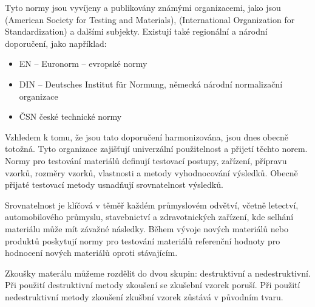 \documentclass[letterpaper,10pt,english]{jupyterBook}
\begin{document}
\noindent{}

\sphinxAtStartPar
Tyto normy jsou vyvíjeny a publikovány známými organizacemi, jako jsou  (American Society for Testing and Materials),  (International Organization for Standardization) a dalšími subjekty. Existují také regionální a národní doporučení, jako například:
\begin{itemize}
\item {} 
\sphinxAtStartPar
EN – Euronorm – evropské normy

\item {} 
\sphinxAtStartPar
DIN – Deutsches Institut für Normung, německá národní normalizační organizace

\item {} 
\sphinxAtStartPar
ČSN \sphinxhyphen{} české technické normy

\end{itemize}

\sphinxAtStartPar
Vzhledem k tomu, že jsou tato doporučení harmonizována, jsou dnes obecně totožná. Tyto organizace zajišťují univerzální použitelnost a přijetí těchto norem. Normy pro testování materiálů definují testovací postupy, zařízení, přípravu vzorků, rozměry vzorků, vlastnosti a metody vyhodnocování výsledků. Obecně přijaté testovací metody usnadňují srovnatelnost výsledků.

\sphinxAtStartPar
Srovnatelnost je klíčová v těměř každém průmyslovém odvětví, včetně letectví, automobilového průmyslu, stavebnictví a zdravotnických zařízení, kde selhání materiálu může mít závažné následky. Během vývoje nových materiálů nebo produktů poskytují normy pro testování materiálů referenční hodnoty pro hodnocení nových materiálů oproti stávajícím.

\sphinxAtStartPar
Zkoušky materálu můžeme rozdělit do dvou skupin: destruktivní a nedestruktivní. Při použití destruktivní metody zkoušení se zkušební vzorek poruší. Při použití nedestruktivní metody zkoušení zkušbní vzorek zůstává v původním tvaru.
\end{document}
